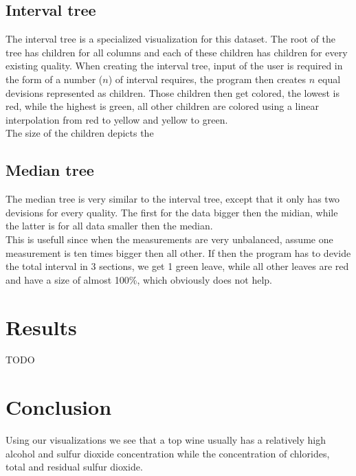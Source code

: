 \documentclass[a4paper,twoside,11pt]{article}
\begin{document}
\subsection{Interval tree}
The interval tree is a specialized visualization for this dataset. The root of the tree has children for all columns and each of these children has children for every existing quality. When creating the interval tree, input of the user is required in the form of a number ($n$) of interval requires, the program then creates $n$ equal devisions represented as children. Those children then get colored, the lowest is red, while the highest is green, all other children are colored using a linear interpolation from red to yellow and yellow to green.\\

The size of the children depicts the 

\subsection{Median tree}
The median tree is very similar to the interval tree, except that it only has two devisions for every quality. The first for the data bigger then the midian, while the latter is for all data smaller then the median.\\

This is usefull since when the measurements are very unbalanced, assume one measurement is ten times bigger then all other. If then the program has to devide the total interval in 3 sections, we get 1 green leave, while all other leaves are red and have a size of almost 100\%, which obviously does not help.

\section{Results}
TODO

\section{Conclusion}
Using our visualizations we see that a top wine usually has a relatively high alcohol and sulfur dioxide concentration while the concentration of chlorides, total and residual sulfur dioxide.
\end{document}
